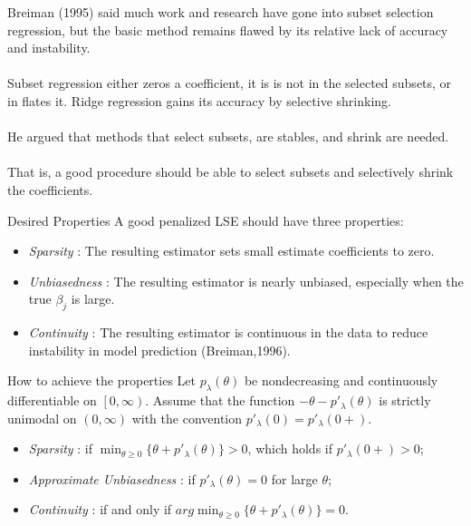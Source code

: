 \documentclass{beamer}
\begin{document}
    \begin{frame}{}
    Breiman (1995) said much work and research have gone into subset selection regression, but the basic method remains flawed by its relative lack of accuracy and instability.\\
    ~\\
    Subset regression either zeros a coefficient, it is is not in the selected subsets, or in flates it. Ridge regression gains its accuracy by selective shrinking. \\
    ~\\
    He argued that methods that select subsets, are stables, and shrink are needed.\\
     ~\\
    That is, a good procedure should be able to select subsets and selectively shrink the coefficients.
    \end{frame}
    
    \begin{frame}{Desired Properties}
        A good penalized LSE should have three properties:
        \begin{itemize}
  	    \item \emph{Sparsity} : The resulting estimator sets small estimate coefficients to zero.
  	    \item \emph{Unbiasedness} : The resulting estimator is nearly unbiased, especially when the true $\beta_j$ is large.
  	    \item \emph{Continuity} : The resulting estimator is continuous in the data to reduce instability in model prediction (Breiman,1996).
        \end{itemize}
    \end{frame}
    
    \begin{frame}{How to achieve the properties}
    	Let $p_\lambda(\theta)$ be nondecreasing and continuously differentiable on $\left [ 0,\infty \right ) $. Assume that the function 
	$-\theta -p'_\lambda(\theta)$ is strictly unimodal on $\left ( 0,\infty \right ) $ with the convention $p'_\lambda(0) = p'_\lambda(0+)$. 
	\begin{itemize}
		\item \emph{Sparsity} : if $\min_{\theta\geq 0 }\{\theta+p'_\lambda(\theta)\} > 0$, which holds if $p'_\lambda(0+) > 0$;
		\item \emph{Approximate Unbiasedness} : if $p'_\lambda(\theta) =0 $ for large $\theta$;
		\item \emph{Continuity} : if and only if $arg\min_{\theta\geq 0}\{\theta+p'_\lambda(\theta)\} = 0$.
	\end{itemize}
    \end{frame}
    
\end{document}
